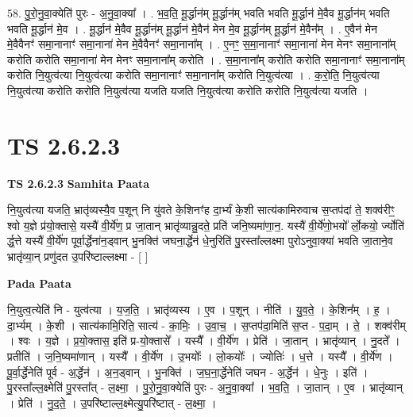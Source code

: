 \documentclass[17pt]{extarticle}
\begin{document}
58. पु॒रो॒नु॒वा॒क्येति॑ पुरः - अ॒नु॒वा॒क्या᳚ । . भ॒व॒ति॒ मू॒र्द्धान॑म् मू॒र्द्धान॑म् भवति भवति मू॒र्द्धान॑ मे॒वैव मू॒र्द्धान॑म् भवति भवति मू॒र्द्धान॑ मे॒व । . मू॒र्द्धान॑ मे॒वैव मू॒र्द्धान॑म् मू॒र्द्धान॑ मे॒वैन॑ मेन मे॒व मू॒र्द्धान॑म् मू॒र्द्धान॑ मे॒वैन᳚म् । . ए॒वैन॑ मेन मे॒वैवैनꣳ॑ समा॒नानाꣳ॑ समा॒नाना॑ मेन मे॒वैवैनꣳ॑ समा॒नाना᳚म् । . ए॒नꣳ॒॒ स॒मा॒नानाꣳ॑ समा॒नाना॑ मेन मेनꣳ समा॒नाना᳚म् करोति करोति समा॒नाना॑ मेन मेनꣳ समा॒नाना᳚म् करोति । . स॒मा॒नाना᳚म् करोति करोति समा॒नानाꣳ॑ समा॒नाना᳚म् करोति नि॒युत्व॑त्या नि॒युत्व॑त्या करोति समा॒नानाꣳ॑ समा॒नाना᳚म् करोति नि॒युत्व॑त्या । . क॒रो॒ति॒ नि॒युत्व॑त्या नि॒युत्व॑त्या करोति करोति नि॒युत्व॑त्या यजति यजति नि॒युत्व॑त्या करोति करोति नि॒युत्व॑त्या यजति । \newline
\pagebreak
{}

\section{ TS 2.6.2.3 }

\textbf{TS 2.6.2.3 } \newline
\textbf{Samhita Paata} \newline

नि॒युत्व॑त्या यजति॒ भ्रातृ॑व्यस्यै॒व प॒शून् नि यु॑वते के॒शिनꣳ॑ह दा॒र्भ्यं के॒शी सात्य॑कामिरुवाच स॒प्तप॑दां ते॒ शक्व॑रीꣳ॒॒ श्वो य॒ज्ञे प्र॑यो॒क्तासे॒ यस्यै॑ वी॒र्ये॑ण॒ प्र जा॒तान् भ्रातृ॑व्यान्नु॒दते॒ प्रति॑ जनि॒ष्यमा॑णा॒न॒. यस्यै॑ वी॒र्ये॑णो॒भयो᳚ र्लो॒कयो॒ र्ज्योति॑ र्द्ध॒त्ते यस्यै॑ वी॒र्ये॑ण पूर्वा॒र्द्धेना॑न॒ड्वान् भु॒नक्ति॑ जघना॒र्द्धेन॑ धे॒नुरिति॑ पु॒रस्ता᳚ल्लक्ष्मा पुरोऽनुवा॒क्या॑ भवति जा॒ताने॒व भ्रातृ॑व्या॒न् प्रणु॑दत उ॒परि॑ष्टाल्लक्ष्मा - [  ] \newline

\textbf{Pada Paata} \newline

नि॒युत्व॒त्येति॑ नि - युत्व॑त्या । य॒ज॒ति॒ । भ्रातृ॑व्यस्य । ए॒व । प॒शून् । नीति॑ । यु॒व॒ते॒ । के॒शिन᳚म् । ह॒ । दा॒र्भ्यम् । के॒शी । सात्य॑कामि॒रिति॒ सात्य॑ - का॒मिः॒ । उ॒वा॒च॒ । स॒प्तप॑दा॒मिति॑ स॒प्त - प॒दा॒म् । ते॒ । शक्व॑रीम् । श्वः । य॒ज्ञे । प्र॒यो॒क्तास॒ इति॑ प्र-यो॒क्तासे᳚ । यस्यै᳚ । वी॒र्ये॑ण । प्रेति॑ । जा॒तान् । भ्रातृ॑व्यान् । नु॒दते᳚ । प्रतीति॑ । ज॒नि॒ष्यमा॑णान् । यस्यै᳚ । वी॒र्ये॑ण । उ॒भयोः᳚ । लो॒कयोः᳚ । ज्योतिः॑ । ध॒त्ते । यस्यै᳚ । वी॒र्ये॑ण । पू॒र्वा॒र्द्धेनेति॑ पूर्व - अ॒र्द्धेन॑ । अ॒न॒ड्वान् । भु॒नक्ति॑ । ज॒घ॒ना॒र्द्धेनेति॑ जघन - अ॒र्द्धेन॑ । धे॒नुः । इति॑ । पु॒रस्ता᳚ल्ल॒क्ष्मेति॑ पु॒रस्ता᳚त् - ल॒क्ष्मा॒ । पु॒रो॒नु॒वा॒क्येति॑ पुरः - अ॒नु॒वा॒क्या᳚ । भ॒व॒ति॒ । जा॒तान् । ए॒व । भ्रातृ॑व्यान् । प्रेति॑ । नु॒द॒ते॒ । उ॒परि॑ष्टाल्ल॒क्ष्मेत्यु॒परि॑ष्टात् - ल॒क्ष्मा॒ ।  \newline
\end{document}
